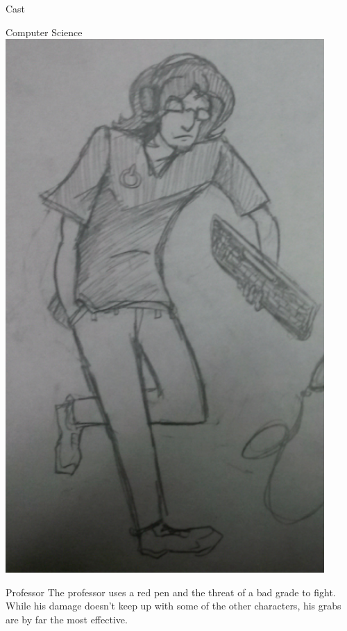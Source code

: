 \documentclass[12pt]{report}
\begin{document}
\begin{section}{Cast}
\begin{subsection}{Computer Science}
\includegraphics[height=8in]{compsci.png}

\end{subsection}
\clearpage

\begin{subsection}{Professor}
The professor uses a red pen and the threat of a bad grade to fight. While his
damage doesn't keep up with some of the other characters, his grabs are by far
the most effective.


\end{subsection}
\end{section}
\end{document}
